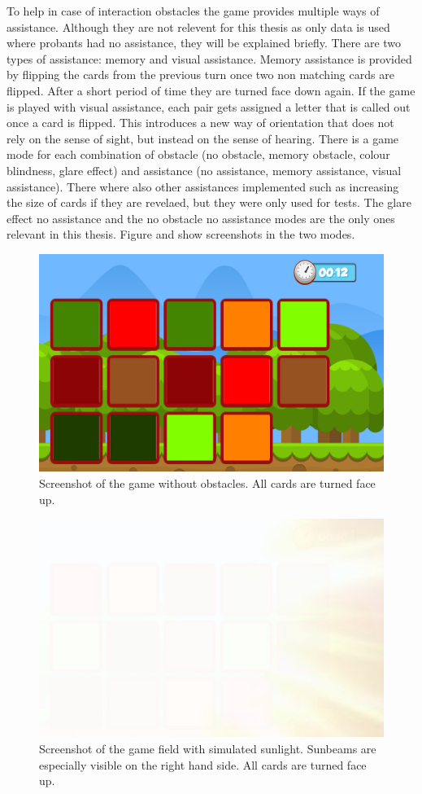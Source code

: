 To help in case of interaction obstacles the game provides multiple ways of assistance. Although they are not relevent for this thesis as only data is used where probants had no assistance, they will be explained briefly. There are two types of assistance: memory and visual assistance. Memory assistance is provided by flipping the cards from the previous turn once two non matching cards are flipped. After a short period of time they are turned face down again. If the game is played with visual assistance, each pair gets assigned a letter that is called out once a card is flipped. This introduces a new way of orientation that does not rely on the sense of sight, but instead on the sense of hearing. There is a game mode for each combination of obstacle (no obstacle, memory obstacle, colour blindness, glare effect) and assistance (no assistance, memory assistance, visual assistance). There where also other assistances implemented such as increasing the size of cards if they are revelaed, but they were only used for tests. The glare effect no assistance and the no obstacle no assistance modes are the only ones relevant in this thesis. Figure  and  show screenshots in the two modes. 

\begin{figure}[H]
	\centering
	\includegraphics[width=14cm]{images/noObstTurned.png}
	\caption[Bild kurz]{Screenshot of the game without obstacles. All cards are turned face up.}
	\label{fig:glareEffect}
\end{figure}

\begin{figure}[H]
	\centering
	\includegraphics[width=14cm]{images/glareEffect.png}
	\caption[Bild kurz]{Screenshot of the game field with simulated sunlight. Sunbeams are especially visible on the right hand side. All cards are turned face up.}
	\label{fig:glareEffect}
\end{figure}